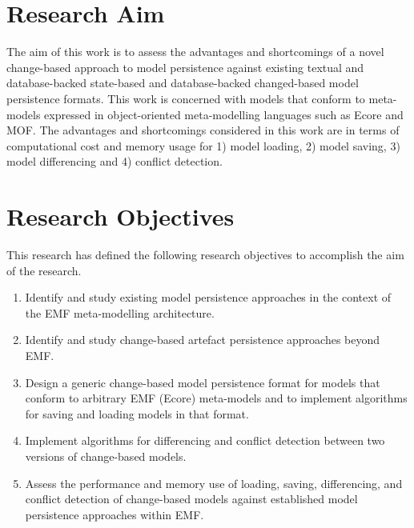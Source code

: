 \section{Research Aim}
\label{sec:research_aim}
The aim of this work is to assess the advantages and shortcomings of a novel change-based approach to model persistence against existing textual and database-backed state-based and database-backed changed-based model persistence formats. This work is concerned with models that conform to meta-models expressed in object-oriented meta-modelling languages such as Ecore and MOF. The advantages and shortcomings considered in this work are in terms of computational cost and memory usage for 1) model loading, 2) model saving, 3) model differencing and 4) conflict detection.

\section{Research Objectives}
\label{sec:research_objectives}
This research has defined the following research objectives to accomplish the aim of the research.
\begin{enumerate}
  \item Identify and study existing model persistence approaches in the context of the EMF meta-modelling architecture.
  \item Identify and study change-based artefact persistence approaches beyond EMF.
  \item Design a generic change-based model persistence format for models that conform to arbitrary EMF (Ecore) meta-models and to implement algorithms for saving and loading models in that format.
  \item Implement algorithms for differencing and conflict detection between two versions of change-based models.
  \item Assess the performance and memory use of loading, saving, differencing, and conflict detection of change-based models against established model persistence approaches within EMF.
\end{enumerate}

